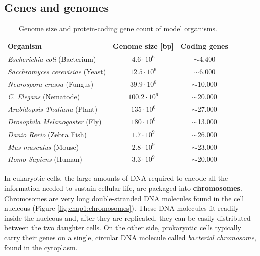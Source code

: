 \subsection{Genes and genomes}
\label{sec:chap1:DNA-genomes}

\begin{table}[h]
\centering
\caption{Genome size and protein-coding gene count of model organisms.}
\begin{tabular}{|l|c|c|}
	\hline
   {\bf Organism} & {\bf Genome size} [bp] & {\bf Coding genes} \\
   \hline
	{\em Escherichia coli} (Bacterium) & $4.6\cdot10^6$ & $\sim$4.400\\ \hline
	{\em Sacchromyces cerevisiae} (Yeast) & $12.5\cdot10^6$ &
   $\sim$6.000\\ \hline
	{\em Neurospora crassa} (Fungus) & $39.9\cdot10^6$ &
   $\sim$10.000\\ \hline
	{\em C. Elegans} (Nematode) & $100.2\cdot10^6$ &
   $\sim$20.000\\ \hline
	{\em Arabidopsis Thaliana} (Plant) & $135\cdot10^6$ & $\sim$27.000\\ \hline
	{\em Drosophila Melanogaster} (Fly) & $180\cdot10^6$ &
   $\sim$13.000\\ \hline
	{\em Danio Rerio} (Zebra Fish) & $1.7\cdot10^9$ & $\sim$26.000\\ \hline
	{\em Mus musculus} (Mouse) & $2.8\cdot10^9$ & $\sim$23.000\\ \hline
	{\em Homo Sapiens} (Human) & $3.3\cdot10^9$ & $\sim$20.000\\ \hline
\end{tabular}
\label{tab:chap1:genome-sizes}
\end{table}

In eukaryotic cells, the large amounts of DNA required to encode all
the information needed to sustain cellular life, are packaged into
{\bf chromosomes}. Chromosomes are very long double-stranded DNA
molecules found in the cell nucleous (Figure \ref{fig:chap1:chromosomes}). These DNA molecules fit
readily inside the nucleous and, after they are replicated, they can
be easily distributed between the two daughter cells. On the other
side, prokaryotic cells typically carry their genes on a single,
circular DNA molecule called {\em bacterial chromosome}, found in the cytoplasm.

